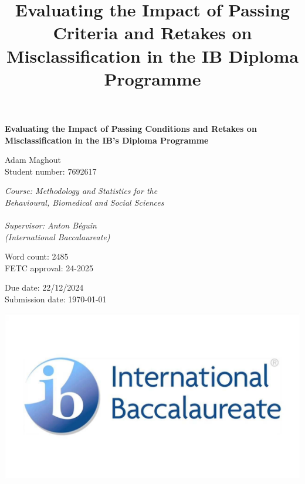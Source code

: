 \documentclass[12pt]{article}
\begin{document}
\title{Evaluating the Impact of Passing Criteria and Retakes on Misclassification in the IB Diploma Programme}
\begin{spacing}{1.5}
\begin{titlepage}
    \centering
    {\LARGE \textbf{Evaluating the Impact of Passing Conditions and Retakes on Misclassification in the IB's Diploma Programme}\par}
    \vspace{1.5cm}
    {\Large Adam Maghout\\Student number: 7692617\par}
    \vspace{1.5cm}
    {\large \textit{Course: Methodology and Statistics for the \\Behavioural, Biomedical and Social Sciences
    \\~\\Supervisor: Anton Béguin\\(International Baccalaureate)}\par}
    \vspace{0.5cm}
    \begin{multicols}{2}
    {\large Word count: 2485\\FETC approval: 24-2025\par}
    \columnbreak
    {\large Due date: 22/12/2024\\Submission date: \today\par}
    \end{multicols}

    \vspace{0.5cm}
    \includegraphics[scale=0.2]{Photos/IB Logo.jpg}
    \vspace*{\fill}
\end{titlepage}
\end{spacing}
\newpage
\end{document}
